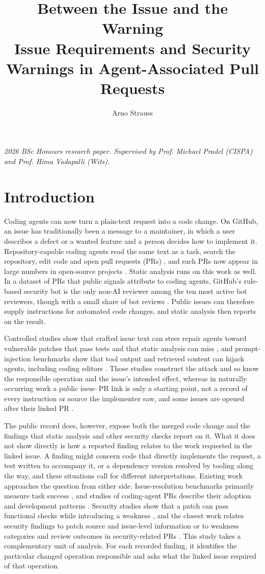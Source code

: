 \documentclass[acmsmall,screen,nonacm,review]{acmart}
\title[Between the Issue and the Warning]{Between the Issue and the Warning\texorpdfstring{\\[0.25em]}{ }Issue Requirements and Security Warnings in Agent-Associated Pull Requests}
\author{Arno Strauss}
\affiliation{\institution{School of Computer Science and Applied Mathematics, University of the Witwatersrand}\city{Johannesburg}\country{South Africa}}
\begin{document}
\maketitle
\raggedbottom
\noindent\textit{2026 BSc Honours research paper. Supervised by Prof. Michael Pradel (CISPA) and Prof. Hima Vadapalli (Wits).}

\section{Introduction}

Coding agents can now turn a plain-text request into a code change. On GitHub, an issue has traditionally been a message to a maintainer, in which a user describes a defect or a wanted feature and a person decides how to implement it. Repository-capable coding agents read the same text as a task, search the repository, edit code and open pull requests (PRs) \cite{b9,b20,b22,b25}, and such PRs now appear in large numbers in open-source projects \cite{b11,b21}. Static analysis runs on this work as well. In a dataset of PRs that public signals attribute to coding agents, GitHub's rule-based security bot is the only non-AI reviewer among the ten most active bot reviewers, though with a small share of bot reviews \cite{b11}. Public issues can therefore supply instructions for automated code changes, and static analysis then reports on the result.

Controlled studies show that crafted issue text can steer repair agents toward vulnerable patches that pass tests and that static analysis can miss \cite{b3,b16}, and prompt-injection benchmarks show that tool output and retrieved content can hijack agents, including coding editors \cite{b6,b12,b24}. Those studies construct the attack and so know the responsible operation and the issue's intended effect, whereas in naturally occurring work a public issue--PR link is only a starting point, not a record of every instruction or source the implementer saw, and some issues are opened after their linked PR \cite{b5}.

The public record does, however, expose both the merged code change and the findings that static analysis and other security checks report on it. What it does not show directly is how a reported finding relates to the work requested in the linked issue. A finding might concern code that directly implements the request, a test written to accompany it, or a dependency version resolved by tooling along the way, and these situations call for different interpretations. Existing work approaches the question from either side. Issue-resolution benchmarks primarily measure task success \cite{b9}, and studies of coding-agent PRs describe their adoption and development patterns \cite{b11,b21}. Security studies show that a patch can pass functional checks while introducing a weakness \cite{b3,b35}, and the closest work relates security findings to patch source and issue-level information \cite{b48} or to weakness categories and review outcomes in security-related PRs \cite{b49}. This study takes a complementary unit of analysis. For each recorded finding, it identifies the particular changed operation responsible and asks what the linked issue required of that operation.
\end{document}
